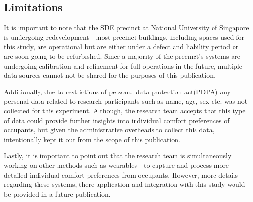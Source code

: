 \documentclass[]{interact}
\theoremstyle{plain}%
\theoremstyle{definition}
\theoremstyle{remark}
\begin{document}


\subsection{Limitations}
It is important to note that the SDE precinct at National University of Singapore is undergoing redevelopment - most precinct buildings, including spaces used for this study, are operational but are either under a defect and liability period or are soon going to be refurbished. Since a majority of the precinct's systems are undergoing calibration and refinement for full operations in the future, multiple data sources cannot not be shared for the purposes of this publication.

Additionally, due to restrictions of personal data protection act(PDPA) any personal data related to research participants such as name, age, sex etc. was not collected for this experiment. Although, the research team accepts that this type of data could provide further insights into individual comfort preferences of occupants, but given the administrative overheads to collect this data, intentionally kept it out from the scope of this publication.         

Lastly, it is important to point out that the research team is simultaneously working on other methods such as wearables - to capture and process more detailed individual comfort preferences from occupants. However, more details regarding these systems, there application and integration with this study would be provided in a future publication.   

\end{document}
